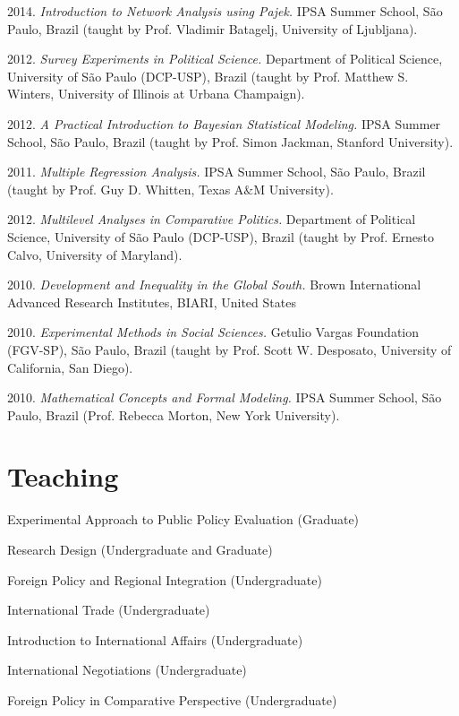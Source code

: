 \documentclass[a4paper,11.5pt]{article}
\renewenvironment{itemize}{
	\begin{list}{}{
			\setlength{\leftmargin}{1.5em}
		}
		}{
	\end{list}
}
\begin{document}
\begin{itemize}
	\item  2014. \emph{Introduction to Network Analysis using Pajek.}  IPSA Summer School, São Paulo, Brazil (taught by Prof. Vladimir Batagelj, University of Ljubljana).
	\item 2012. \emph{Survey Experiments in Political Science.}   Department of Political Science, University of São Paulo (DCP-USP), Brazil (taught by Prof. Matthew S. Winters, University of Illinois at Urbana Champaign).
	\item 2012. \emph{A Practical Introduction to Bayesian Statistical Modeling.}  IPSA Summer School, São Paulo, Brazil (taught by Prof. Simon Jackman, Stanford University).
	\item  2011. \emph{Multiple Regression Analysis.}  IPSA Summer School, São Paulo, Brazil (taught by Prof. Guy D. Whitten, Texas A$\&$M University).
	\item 2012. \emph{Multilevel Analyses in Comparative Politics.}   Department of Political Science, University of São Paulo (DCP-USP), Brazil (taught by Prof. Ernesto Calvo, University of Maryland).
	\item 2010. \emph{Development and Inequality in the Global South.}  Brown International Advanced Research Institutes, BIARI, United States
	\item  2010. \emph{Experimental Methods in Social Sciences.}  Getulio Vargas Foundation (FGV-SP), São Paulo, Brazil (taught by Prof. Scott W. Desposato, University of California, San Diego).
	\item 2010. \emph{Mathematical Concepts and Formal Modeling.}  IPSA Summer School, São Paulo, Brazil (Prof. Rebecca Morton, New York University).
\end{itemize}

\section*{Teaching}

\begin{itemize}
	\item Experimental Approach to Public Policy Evaluation (Graduate)
	\item Research Design (Undergraduate and Graduate)
	\item Foreign Policy and Regional Integration (Undergraduate)
	\item International Trade (Undergraduate)
	\item Introduction to International Affairs (Undergraduate)
	\item International Negotiations (Undergraduate)
	\item Foreign Policy in Comparative Perspective (Undergraduate)
\end{itemize}
\end{document}
